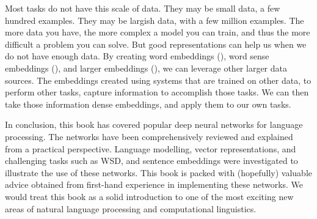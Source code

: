 \documentclass[12pt,parskip]{komatufte}
\begin{document}
Most tasks do not have this scale of data.
They may be small data, a few hundred examples.
They may be largish data, with a few million examples.
The more data you have, the more complex a model you can train,
and thus the more difficult a problem you can solve.
But good representations can help us when we do not have enough data.
By creating word embeddings (),
word sense embeddings (),
and larger embeddings (),
we can leverage other larger data sources.
The embeddings created using systems that are trained on other data, to perform other tasks,
capture information to accomplish those tasks.
We can then take those information dense embeddings, and apply them to our own tasks.

In conclusion,
this book has covered popular deep neural networks for language processing.
The networks have been comprehensively reviewed and explained from a practical perspective.
Language modelling, vector representations, and challenging tasks such as WSD, and sentence embeddings were  investigated to illustrate the use of these networks.
This book is packed with (hopefully) valuable advice obtained from first-hand experience in implementing these networks.
We would treat this book as a solid introduction to one of the most exciting new areas of natural language processing and computational linguistics.
\end{document}
